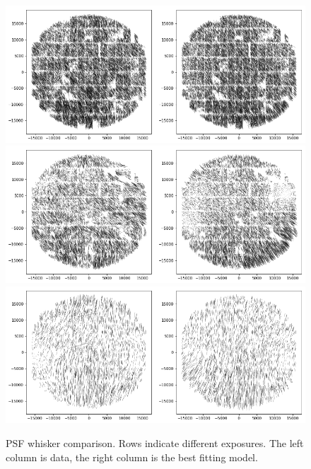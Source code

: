 \documentclass{article}
\begin{document}
\begin{figure}
    \includegraphics[width=\textwidth]{w_69008.png}
    \includegraphics[width=\textwidth]{w_69014.png}
    \includegraphics[width=\textwidth]{w_69026.png}

    \caption{PSF whisker comparison.  Rows indicate different exposures.  The
    left column is data, the right column is the best fitting model.}

\end{figure}
\end{document}
